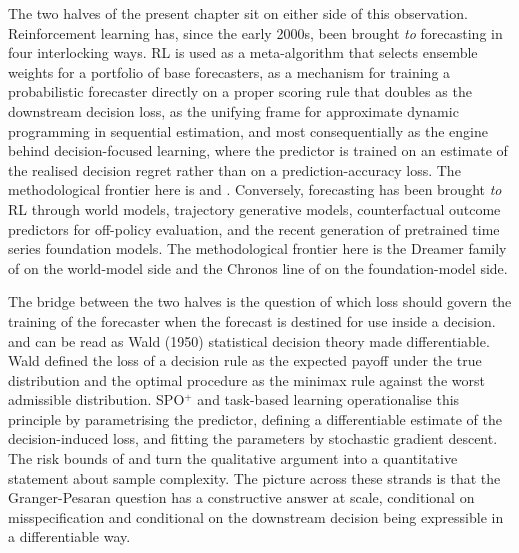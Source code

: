 The two halves of the present chapter sit on either side of this observation.
Reinforcement learning has, since the early 2000s, been brought \emph{to} forecasting
in four interlocking ways. RL is used as a meta-algorithm that selects ensemble
weights for a portfolio of base forecasters, as a mechanism for training a
probabilistic forecaster directly on a proper scoring rule that doubles as the
downstream decision loss, as the unifying frame for approximate dynamic programming
in sequential estimation, and most consequentially as the engine behind
decision-focused learning, where the predictor is trained on an estimate of the
realised decision regret rather than on a prediction-accuracy loss. The
methodological frontier here is \citet{ElmachtoubGrigas2022} and
\citet{DontiAmosKolter2017}. Conversely, forecasting has been brought \emph{to} RL
through world models, trajectory generative models, counterfactual outcome predictors
for off-policy evaluation, and the recent generation of pretrained time series
foundation models. The methodological frontier here is the Dreamer family of
\citet{Hafner2025} on the world-model side and the Chronos line of \citet{Ansari2024}
on the foundation-model side.

The bridge between the two halves is the question of which loss should govern the
training of the forecaster when the forecast is destined for use inside a decision.
\citet{ElmachtoubGrigas2022} and \citet{DontiAmosKolter2017} can be read as Wald
(1950) statistical decision theory made differentiable. Wald defined the loss of a
decision rule as the expected payoff under the true distribution and the optimal
procedure as the minimax rule against the worst admissible distribution. SPO$^+$
and task-based learning operationalise this principle by parametrising the
predictor, defining a differentiable estimate of the decision-induced loss, and
fitting the parameters by stochastic gradient descent. The risk bounds of
\citet{LiuGrigas2021} and \citet{HuangGupta2024} turn the qualitative argument into
a quantitative statement about sample complexity. The picture across these strands
is that the Granger-Pesaran question has a constructive answer at scale, conditional
on misspecification and conditional on the downstream decision being expressible in
a differentiable way.

